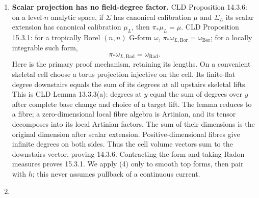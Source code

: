 \documentclass[
  11pt,
]{article}
\begin{document}
\begin{enumerate}
  locally integrable on the calibrated tropical polyhedron, and then
  \(f_*((f^*a)_{\mathrm{Rad}})=\langle a,\mu_{\Pi_f}\rangle_{\mathrm{Rad}}\);
  the corresponding integrals agree. In particular a smooth top form is
  finite on a compact moment domain. Lower-dimensional cells have no top
  measure. Compact moment images are finite polyhedra by the
  polyhedrality assertion of CLD Theorem 12.2.4. The dimension bound is
  specifically CLD 12.2.10(1)--(2):
  \(\dim_{\mathrm{trop},x}f\le d_K(x)\le\dim_xX\) and, for compact
  \(X\), \(\dim f_{\mathrm{trop}}(X)=\sup_x\dim_{\mathrm{trop},x}f\).
  Thus compact curve images have dimension at most one. We do not use a
  claim that a moment image always has dimension equal to its source;
  constant moments rule out that reading. CLD 7.3.5 defines integration
  currents for locally integrable multipliers; a continuous finite
  multiplier is locally integrable. Section 8 proves the carrier
  total-variation estimate needed here, before any possibly cancelling
  signed pushforward.
\item
  \textbf{Scalar projection has no field-degree factor.} CLD Proposition
  14.3.6: on a level-\(n\) analytic space, if \(\Sigma\) has canonical
  calibration \(\mu\) and \(\Sigma_L\) its scalar extension has
  canonical calibration \(\mu_L\), then \(\pi_*\mu_L=\mu\). CLD
  Proposition 15.3.1: for a tropically Borel \((n,n)\) G-form
  \(\omega\), \(\pi_*\omega_{L,\mathrm{Bor}}=\omega_{\mathrm{Bor}}\);
  for a locally integrable such form, \[
             \pi_*\omega_{L,\mathrm{Rad}}
                       =\omega_{\mathrm{Rad}}.          \tag{4}
  \] Here is the primary proof mechanism, retaining its lengths. On a
  convenient skeletal cell choose a torus projection injective on the
  cell. Its finite-flat degree downstairs equals the sum of its degrees
  at all upstairs skeletal lifts. This is CLD Lemma 13.3.3(a): degrees
  at \(y\) equal the sum of degrees over \(y\) after complete base
  change and choice of a target lift. The lemma reduces to a fibre; a
  zero-dimensional local fibre algebra is Artinian, and its tensor
  decomposes into its local Artinian factors. The sum of their
  dimensions is the original dimension after scalar extension.
  Positive-dimensional fibres give infinite degrees on both sides. Thus
  the cell volume vectors sum to the downstairs vector, proving 14.3.6.
  Contracting the form and taking Radon measures proves 15.3.1. We apply
  (4) only to smooth top forms, then pair with \(h\); this never assumes
  pullback of a continuous current.
\item

\end{enumerate}
\end{document}
